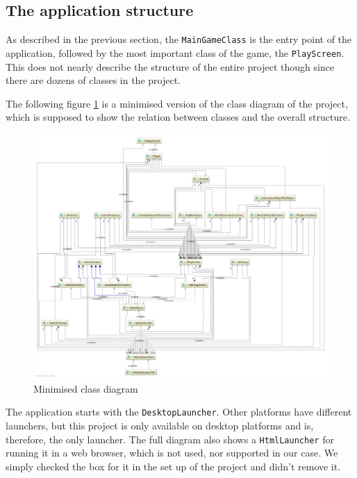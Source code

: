 \documentclass[12p]{article}
\begin{document}

\newpage
\subsection{The application structure} \label{DocApplicationStructure}

As described in the previous section, the \texttt{MainGameClass} is the entry point of the application, followed by the most important class of the game, the \texttt{PlayScreen}. This does not nearly describe the structure of the entire project though since there are dozens of classes in the project.

The following figure \ref{fig:minClassDiagram} is a minimised version of the class diagram of the project, which is supposed to show the relation between classes and the overall structure.

\begin{figure}[ht]
  \centering
  \includegraphics[width=1\textwidth]{Documentation/class_diagram_minimized.png}
  \caption{Minimised class diagram}
  \label{fig:minClassDiagram}
\end{figure}

The application starts with the \texttt{DesktopLauncher}. Other platforms have different launchers, but this project is only available on desktop platforms and is, therefore, the only launcher. The full diagram also shows a \texttt{HtmlLauncher} for running it in a web browser, which is not used, nor supported in our case. We simply checked the box for it in the set up of the project and didn't remove it.
\end{document}
